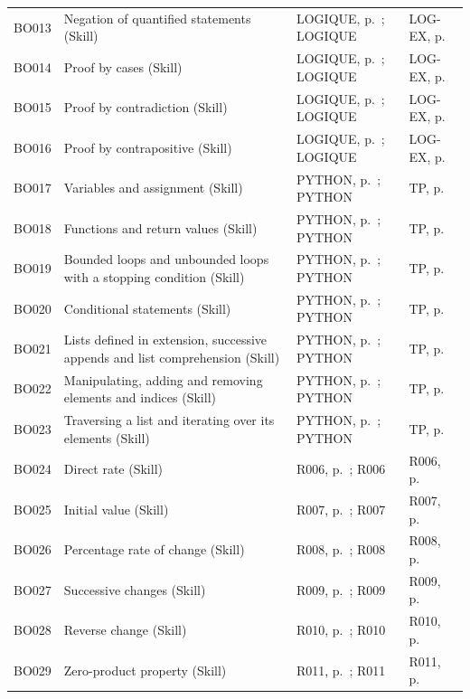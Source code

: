 \begin{longtable}{p{.1\linewidth}p{.43\linewidth}p{.19\linewidth}p{.16\linewidth}}
BO013 & Negation of quantified statements (Skill) & LOGIQUE, p.\,\pageref{LOGIQUE} ; LOGIQUE & LOG-EX, p.\,\pageref{LOG-EX} \\
BO014 & Proof by cases (Skill) & LOGIQUE, p.\,\pageref{LOGIQUE} ; LOGIQUE & LOG-EX, p.\,\pageref{LOG-EX} \\
BO015 & Proof by contradiction (Skill) & LOGIQUE, p.\,\pageref{LOGIQUE} ; LOGIQUE & LOG-EX, p.\,\pageref{LOG-EX} \\
BO016 & Proof by contrapositive (Skill) & LOGIQUE, p.\,\pageref{LOGIQUE} ; LOGIQUE & LOG-EX, p.\,\pageref{LOG-EX} \\
BO017 & Variables and assignment (Skill) & PYTHON, p.\,\pageref{PYTHON} ; PYTHON & TP, p.\,\pageref{TP} \\
BO018 & Functions and return values (Skill) & PYTHON, p.\,\pageref{PYTHON} ; PYTHON & TP, p.\,\pageref{TP} \\
BO019 & Bounded loops and unbounded loops with a stopping condition (Skill) & PYTHON, p.\,\pageref{PYTHON} ; PYTHON & TP, p.\,\pageref{TP} \\
BO020 & Conditional statements (Skill) & PYTHON, p.\,\pageref{PYTHON} ; PYTHON & TP, p.\,\pageref{TP} \\
BO021 & Lists defined in extension, successive appends and list comprehension (Skill) & PYTHON, p.\,\pageref{PYTHON} ; PYTHON & TP, p.\,\pageref{TP} \\
BO022 & Manipulating, adding and removing elements and indices (Skill) & PYTHON, p.\,\pageref{PYTHON} ; PYTHON & TP, p.\,\pageref{TP} \\
BO023 & Traversing a list and iterating over its elements (Skill) & PYTHON, p.\,\pageref{PYTHON} ; PYTHON & TP, p.\,\pageref{TP} \\
BO024 & Direct rate (Skill) & R006, p.\,\pageref{R006} ; R006 & R006, p.\,\pageref{R006} \\
BO025 & Initial value (Skill) & R007, p.\,\pageref{R007} ; R007 & R007, p.\,\pageref{R007} \\
BO026 & Percentage rate of change (Skill) & R008, p.\,\pageref{R008} ; R008 & R008, p.\,\pageref{R008} \\
BO027 & Successive changes (Skill) & R009, p.\,\pageref{R009} ; R009 & R009, p.\,\pageref{R009} \\
BO028 & Reverse change (Skill) & R010, p.\,\pageref{R010} ; R010 & R010, p.\,\pageref{R010} \\
BO029 & Zero-product property (Skill) & R011, p.\,\pageref{R011} ; R011 & R011, p.\,\pageref{R011} \\

\end{longtable}
